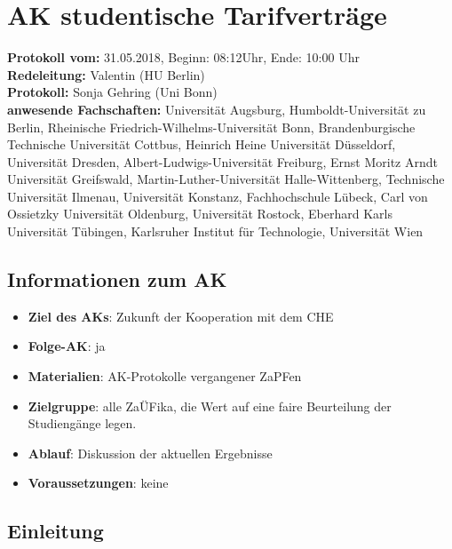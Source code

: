 
\section{AK studentische Tarifverträge}

	\textbf{Protokoll vom:} 31.05.2018,
	Beginn: 08:12Uhr,
	Ende: 10:00 Uhr \\
	\textbf{Redeleitung:} Valentin (HU Berlin) \\
	\textbf{Protokoll:} Sonja Gehring (Uni Bonn) \\
	\textbf{anwesende Fachschaften:} Universität Augsburg, Humboldt-Universität zu Berlin, Rheinische Friedrich-Wilhelms-Universität Bonn, Brandenburgische Technische Universität Cottbus, Heinrich Heine Universität Düsseldorf, Universität Dresden, Albert-Ludwigs-Universität Freiburg, Ernst Moritz Arndt Universität Greifswald, Martin-Luther-Universität Halle-Wittenberg, Technische Universität Ilmenau, Universität Konstanz, Fachhochschule Lübeck, Carl von Ossietzky Universität Oldenburg, Universität Rostock, Eberhard Karls Universität Tübingen, Karlsruher Institut für Technologie, Universität Wien

	\subsection*{Informationen zum AK}
		\begin{itemize}
			\item \textbf{Ziel des AKs}: Zukunft der Kooperation mit dem CHE
			\item \textbf{Folge-AK}: ja
      \item \textbf{Materialien}: AK-Protokolle vergangener ZaPFen
			\item \textbf{Zielgruppe}: alle ZaÜFika, die Wert auf eine faire Beurteilung der Studiengänge legen.
			\item \textbf{Ablauf}: Diskussion der aktuellen Ergebnisse
			\item \textbf{Voraussetzungen}: keine
		\end{itemize}

  \subsection*{Einleitung}
